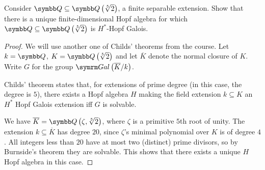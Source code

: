 \begin{exercise}
Consider \(\rationals \subseteq \adjoin{\sqrt[5]{2}}\), a finite separable extension. Show that there is a unique finite-dimensional Hopf algebra for which \(\rationals \subseteq \adjoin{\sqrt[5]{2}}\) is \(H^*\)-Hopf Galois.
\end{exercise}
\begin{proof}
We will use another one of Childs' theorems from the course. Let \(k = \rationals\), \(K = \adjoin{\sqrt[5]{2}}\) and let \(\overline{K}\) denote the normal closure of \(K\). Write \(G\) for the group \(\Gal{\overline{K}}{k}\).

Childs' theorem states that, for extensions of prime degree (in this case, the degree is \(5\)), there exists a Hopf algebra \(H\) making the field extension \(k \subseteq K\) an \(H^*\) Hopf Galois extension iff \(G\) is solvable.

We have \(\overline{K} = \adjoin{\zeta, \sqrt[5]{2}}\), where \(\zeta\) is a primitive \(5\)th root of unity. The extension \(k \subseteq \overline{K}\) has degree \(20\), since \(\zeta\)'s minimal polynomial over \(K\) is of degree \(4\). All integers less than \(20\) have at most two (distinct) prime divisors, so by Burnside's theorem they are solvable. This shows that there exists a unique \(H\) Hopf algebra in this case.
\end{proof}
